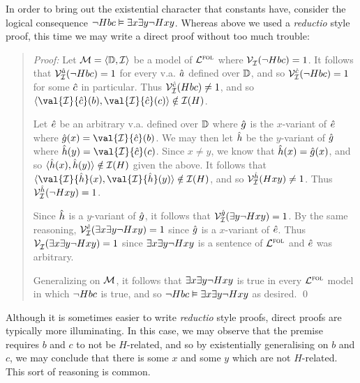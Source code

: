 In order to bring out the existential character that constants have, consider the logical consequence $\neg Hbc \vDash \exists x \exists y \neg Hxy$.
Whereas above we used a \textit{reductio} style proof, this time we may write a direct proof without too much trouble:

\begin{quote}
\label{allmodels4}
  \textit{Proof:}
  Let $\mathcal{M}=\langle\mathbb{D},\mathcal{I}\rangle$ be a model of $\mathcal{L}^{\textsc{fol}}$ where $\mathcal{V}_{\mathcal{I}}^{}(\neg Hbc)=1$.
  It follows that $\mathcal{V}_{\mathcal{I}}^{\hat{a}}(\neg Hbc)=1$ for every v.a. $\hat{a}$ defined over $\mathbb{D}$, and so $\mathcal{V}_{\mathcal{I}}^{\hat{c}}(\neg Hbc) = 1$ for some $\hat{c}$ in particular.
  Thus $\mathcal{V}_{\mathcal{I}}^{\hat{c}}(Hbc) \neq 1$, and so $\tuple{\val{\I}{\va{c}}(b),\val{\I}{\va{c}}(c)}\notin \I(H)$.

  Let $\hat{e}$ be an arbitrary v.a. defined over $\mathbb{D}$ where $\hat{g}$ is the $x$-variant of $\hat{e}$ where $\va{g}(x)=\val{\I}{\va{c}}(b)$.
  We may then let $\hat{h}$ be the $y$-variant of $\hat{g}$ where $\va{h}(y)=\val{\I}{\va{c}}(c)$.
  Since $x\neq y$, we know that $\hat{h}(x)=\hat{g}(x)$, and so $\langle\hat{h}(x),\hat{h}(y)\rangle\notin \mathcal{I}(H)$ given the above.
  It follows that $\tuple{\val{\I}{\va{h}}(x),\val{\I}{\va{h}}(y)}\notin \I(H)$, and so $\mathcal{V}_{\mathcal{I}}^{\hat{h}}(Hxy)\neq 1$.
  Thus $\mathcal{V}_{\mathcal{I}}^{\hat{h}}(\neg Hxy)=1$.

  Since $\hat{h}$ is a $y$-variant of $\hat{g}$, it follows that $\mathcal{V}_{\mathcal{I}}^{\hat{g}}(\exists y\neg Hxy)=1$.
  By the same reasoning, $\mathcal{V}_{\mathcal{I}}^{\hat{e}}(\exists x\exists y\neg Hxy)=1$ since $\hat{g}$ is a $x$-variant of $\hat{e}$.
  Thus $\mathcal{V}_{\mathcal{I}}^{}(\exists x\exists y\neg Hxy)=1$ since $\exists x\exists y\neg Hxy$ is a sentence of $\mathcal{L}^{\textsc{fol}}$ and $\hat{e}$ was arbitrary. 

  Generalizing on $\mathcal{M}$, it follows that $\exists x \exists y \neg Hxy$ is true in every $\mathcal{L}^{\textsc{fol}}$ model in which $\neg Hbc$ is true, and so $\neg Hbc \vDash \exists x \exists y \neg Hxy$ as desired.
  \qed
\end{quote}

Although it is sometimes easier to write \textit{reductio} style proofs, direct proofs are typically more illuminating.
In this case, we may observe that the premise requires $b$ and $c$ to not be $H$-related, and so by existentially generalising on $b$ and $c$, we may conclude that there is some $x$ and some $y$ which are not $H$-related. 
This sort of reasoning is common.

